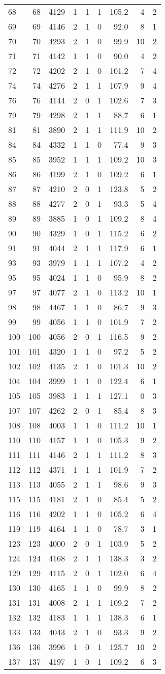 \documentclass[]{article}
\begin{document}
\begin{longtable}[]{@{}lrrlrrrrr@{}}
68 & 68 & 4129 & 1 & 1 & 1 & 105.2 & 4 & 2\tabularnewline
69 & 69 & 4146 & 2 & 1 & 0 & 92.0 & 8 & 1\tabularnewline
70 & 70 & 4293 & 2 & 1 & 0 & 99.9 & 10 & 2\tabularnewline
71 & 71 & 4142 & 1 & 1 & 0 & 90.0 & 4 & 2\tabularnewline
72 & 72 & 4202 & 2 & 1 & 0 & 101.2 & 7 & 4\tabularnewline
74 & 74 & 4276 & 2 & 1 & 1 & 107.9 & 9 & 4\tabularnewline
76 & 76 & 4144 & 2 & 0 & 1 & 102.6 & 7 & 3\tabularnewline
79 & 79 & 4298 & 2 & 1 & 1 & 88.7 & 6 & 1\tabularnewline
81 & 81 & 3890 & 2 & 1 & 1 & 111.9 & 10 & 2\tabularnewline
84 & 84 & 4332 & 1 & 1 & 0 & 77.4 & 9 & 3\tabularnewline
85 & 85 & 3952 & 1 & 1 & 1 & 109.2 & 10 & 3\tabularnewline
86 & 86 & 4199 & 2 & 1 & 0 & 109.2 & 6 & 1\tabularnewline
87 & 87 & 4210 & 2 & 0 & 1 & 123.8 & 5 & 2\tabularnewline
88 & 88 & 4277 & 2 & 0 & 1 & 93.3 & 5 & 4\tabularnewline
89 & 89 & 3885 & 1 & 0 & 1 & 109.2 & 8 & 4\tabularnewline
90 & 90 & 4329 & 1 & 0 & 1 & 115.2 & 6 & 2\tabularnewline
91 & 91 & 4044 & 2 & 1 & 1 & 117.9 & 6 & 1\tabularnewline
93 & 93 & 3979 & 1 & 1 & 1 & 107.2 & 4 & 2\tabularnewline
95 & 95 & 4024 & 1 & 1 & 0 & 95.9 & 8 & 2\tabularnewline
97 & 97 & 4077 & 2 & 1 & 0 & 113.2 & 10 & 1\tabularnewline
98 & 98 & 4467 & 1 & 1 & 0 & 86.7 & 9 & 3\tabularnewline
99 & 99 & 4056 & 1 & 1 & 0 & 101.9 & 7 & 2\tabularnewline
100 & 100 & 4056 & 2 & 0 & 1 & 116.5 & 9 & 2\tabularnewline
101 & 101 & 4320 & 1 & 1 & 0 & 97.2 & 5 & 2\tabularnewline
102 & 102 & 4135 & 2 & 1 & 0 & 101.3 & 10 & 2\tabularnewline
104 & 104 & 3999 & 1 & 1 & 0 & 122.4 & 6 & 1\tabularnewline
105 & 105 & 3983 & 1 & 1 & 1 & 127.1 & 0 & 3\tabularnewline
107 & 107 & 4262 & 2 & 0 & 1 & 85.4 & 8 & 3\tabularnewline
108 & 108 & 4003 & 1 & 1 & 0 & 111.2 & 10 & 1\tabularnewline
110 & 110 & 4157 & 1 & 1 & 0 & 105.3 & 9 & 2\tabularnewline
111 & 111 & 4146 & 2 & 1 & 1 & 111.2 & 8 & 3\tabularnewline
112 & 112 & 4371 & 1 & 1 & 1 & 101.9 & 7 & 2\tabularnewline
113 & 113 & 4055 & 2 & 1 & 1 & 98.6 & 9 & 3\tabularnewline
115 & 115 & 4181 & 2 & 1 & 0 & 85.4 & 5 & 2\tabularnewline
116 & 116 & 4202 & 1 & 1 & 0 & 105.2 & 6 & 4\tabularnewline
119 & 119 & 4164 & 1 & 1 & 0 & 78.7 & 3 & 1\tabularnewline
123 & 123 & 4000 & 2 & 0 & 1 & 103.9 & 5 & 2\tabularnewline
124 & 124 & 4168 & 2 & 1 & 1 & 138.3 & 3 & 2\tabularnewline
129 & 129 & 4115 & 2 & 0 & 1 & 102.0 & 6 & 4\tabularnewline
130 & 130 & 4165 & 1 & 1 & 0 & 99.9 & 8 & 2\tabularnewline
131 & 131 & 4008 & 2 & 1 & 1 & 109.2 & 7 & 2\tabularnewline
132 & 132 & 4183 & 1 & 1 & 1 & 138.3 & 6 & 1\tabularnewline
133 & 133 & 4043 & 2 & 1 & 0 & 93.3 & 9 & 2\tabularnewline
136 & 136 & 3996 & 1 & 0 & 1 & 125.7 & 10 & 2\tabularnewline
137 & 137 & 4197 & 1 & 0 & 1 & 109.2 & 6 & 3\tabularnewline

\end{longtable}
\end{document}
